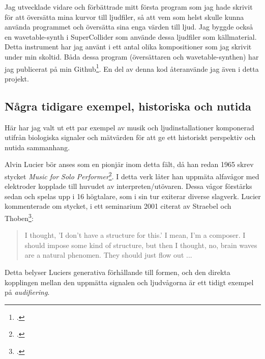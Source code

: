 \documentclass[11pt, a4paper]{article} %
\begin{document}
Jag utvecklade vidare och förbättrade mitt första program som jag hade skrivit för att översätta mina kurvor till ljudfiler, så att vem som helst skulle kunna använda programmet och översätta sina enga värden till ljud. Jag byggde också en wavetable-synth i SuperCollider som använde dessa ljudfiler som källmaterial. Detta instrument har jag använt i ett antal olika kompositioner som jag skrivit under min skoltid. Båda dessa program (översättaren och wavetable-synthen) har jag publicerat på min Github\footcite{jondell_kj-jondelldiabetes-synth_2021}. En del av denna kod återanvände jag även i detta projekt.

\subsection*{Några tidigare exempel, historiska och nutida}
Här har jag valt ut ett par exempel av musik och ljudinstallationer komponerad utifrån biologiska signaler och mätvärden för att ge ett historiskt perspektiv och nutida sammanhang.

Alvin Lucier bör anses som en pionjär inom detta fält, då han redan 1965 skrev stycket \emph{Music for Solo Performer}\footcite{lucier_music_1965}. I detta verk låter han uppmäta alfavågor med elektroder kopplade till huvudet av interpreten/utövaren. Dessa vågor förstärks sedan och spelas upp i 16 högtalare, som i sin tur exiterar diverse slagverk. Lucier kommenterade om stycket, i ett seminarium 2001 citerat av Straebel och Thoben\footcite{straebel_alvin_2014}:

\begin{quote}
  I thought, 'I don't have a structure for this.' I mean, I'm a composer. I should impose some kind of structure, but then I thought, no, brain waves are a natural phenomen. They should just flow out ... %
\end{quote}

Detta belyser Luciers generativa förhållande till formen, och den direkta kopplingen mellan den uppmätta signalen och ljudvågorna är ett tidigt exempel på \emph{audifiering}.
\end{document}
